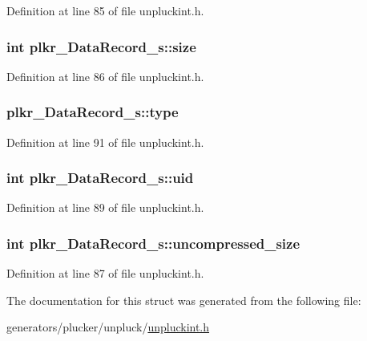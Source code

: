 Definition at line 85 of file unpluckint.\+h.

\hypertarget{structplkr__DataRecord__s_ac15867fee863318b96e3f9d27a1784e6}{
\subsubsection[{size}]{\setlength{\rightskip}{0pt plus 5cm}int plkr\+\_\+\+Data\+Record\+\_\+s\+::size}}\label{structplkr__DataRecord__s_ac15867fee863318b96e3f9d27a1784e6}


Definition at line 86 of file unpluckint.\+h.

\hypertarget{structplkr__DataRecord__s_a75431a1f26dc15418437086487724ff6}{
\subsubsection[{type}]{ plkr\+\_\+\+Data\+Record\+\_\+s\+::type}}\label{structplkr__DataRecord__s_a75431a1f26dc15418437086487724ff6}


Definition at line 91 of file unpluckint.\+h.

\hypertarget{structplkr__DataRecord__s_afd7b53eef587427617f90ec51d69fbeb}{
\subsubsection[{uid}]{\setlength{\rightskip}{0pt plus 5cm}int plkr\+\_\+\+Data\+Record\+\_\+s\+::uid}}\label{structplkr__DataRecord__s_afd7b53eef587427617f90ec51d69fbeb}


Definition at line 89 of file unpluckint.\+h.

\hypertarget{structplkr__DataRecord__s_a5c602d9d4b060310b9d1eda5bac08f59}{
\subsubsection[{uncompressed\+\_\+size}]{\setlength{\rightskip}{0pt plus 5cm}int plkr\+\_\+\+Data\+Record\+\_\+s\+::uncompressed\+\_\+size}}\label{structplkr__DataRecord__s_a5c602d9d4b060310b9d1eda5bac08f59}


Definition at line 87 of file unpluckint.\+h.



The documentation for this struct was generated from the following file\+:\begin{DoxyCompactItemize}
\item 
generators/plucker/unpluck/\hyperlink{unpluckint_8h}{unpluckint.\+h}\end{DoxyCompactItemize}
